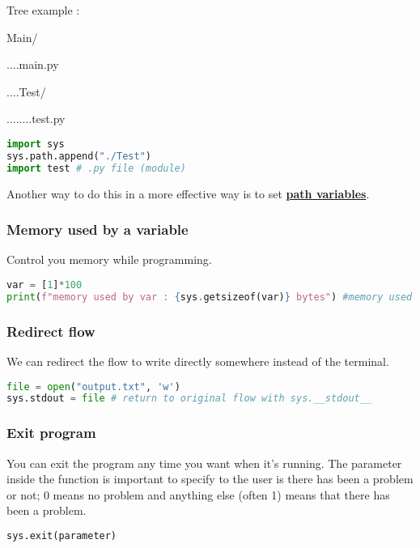 \documentclass[a4paper, 12pt, titlepage]{scrartcl} %
\begin{document}
\vspace{5mm}

Tree example : 

Main/ 

....main.py 

....Test/ 

........test.py 

\begin{lstlisting}[language=Python]
import sys
sys.path.append("./Test")
import test # .py file (module)
\end{lstlisting} \vspace{5mm}

Another way to do this in a more effective way is to set \hyperref[subsec:EnvironmentVariables]{\textbf{path variables}}.

\subsubsection{Memory used by a variable}
Control you memory while programming. 
\begin{lstlisting}[language=Python]
var = [1]*100
print(f"memory used by var : {sys.getsizeof(var)} bytes") #memory used by var : 856 bytes
\end{lstlisting} \vspace{5mm}

\subsubsection{Redirect flow}
We can redirect the flow to write directly somewhere instead of the terminal.
\begin{lstlisting}[language=Python]
file = open("output.txt", 'w')
sys.stdout = file # return to original flow with sys.__stdout__
\end{lstlisting} \vspace{5mm}

\subsubsection{Exit program}
You can exit the program any time you want when it's running. The parameter inside the function is important to specify to the user is there has been a problem or not; 0 means no problem and anything else (often 1) means that there has been a problem.
\begin{lstlisting}[language=Python]
sys.exit(parameter)
\end{lstlisting} \vspace{5mm}
\end{document}
